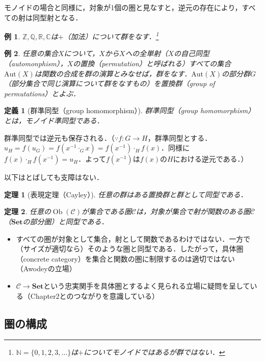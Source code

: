 \documentclass[dvipdfmx,a4j,10pt]{jsarticle}
\theoremstyle{mystyle1}
\theoremstyle{mystyle2}
\newtheorem{dfn*}{定義}
\newtheorem{thm*}{定理}
\newtheorem{example}{例}
\DeclareMathOperator{\Ob}{Ob}
\begin{document}
モノイドの場合と同様に，対象が1個の圏と見なすと，逆元の存在により，すべての射は同型射となる．

\begin{example}
	$\mathbb{Z},\mathbb{Q},\mathbb{R},\mathbb{C}$は$+$（加法）について群をなす．\footnote{$\mathbb{N}=\{0,1,2,3,\ldots\}$は$+$についてモノイドではあるが群ではない．}
\end{example}

\begin{example}
	任意の集合$X$について，$X$から$X$への全単射（$X$の自己同型（automonphism），$X$の置換（permutation）と呼ばれる）すべての集合$\mathrm{Aut}(X)$は関数の合成を群の演算とみなせば，群をなす．$\mathrm{Aut}(X)$の部分群$G$（部分集合で同じ演算について群をなすもの）を置換群（group of permutations）とよぶ．
\end{example}

\begin{dfn*}[群準同型（group homomorphism）]
	群準同型（group homomorphism）とは，モノイド準同型である．
\end{dfn*}

群準同型では逆元も保存される．（$\because$$f:G\to H$，群準同型とする．$u_H=f(u_G)=f(x^{-1}\cdot_G x)=f(x^{-1})\cdot_H f(x)$．同様に$f(x)\cdot_H f(x^{-1})=u_H$．よって$f(x^{-1})$は$f(x)$の$H$における逆元である．）

	以下はとばしても支障はない．
	\begin{thm*}[表現定理（Cayley）]
		任意の群はある置換群と群として同型である．
	\end{thm*}

	\begin{thm*}
		任意の$\Ob(\mathcal{C})$が集合である圏$\mathcal{C}$は，対象が集合で射が関数のある圏$\overline{\mathcal{C}}$（$\mathbf{Set}$の部分圏）と同型である．
	\end{thm*}

	\begin{itemize}
		\item すべての圏が対象として集合，射として関数であるわけではない．一方で（サイズが適切なら）そのような圏と同型である．したがって，具体圏（concrete category）を集合と関数の圏に制限するのは適切ではない（Awodeyの立場）
		\item $\mathcal{C}\to\mathbf{Set}$という忠実関手を具体圏とするよく見られる立場に疑問を呈している（Chapter2とのつながりを意識している）
	\end{itemize}

	\subsection{圏の構成}
\end{document}
